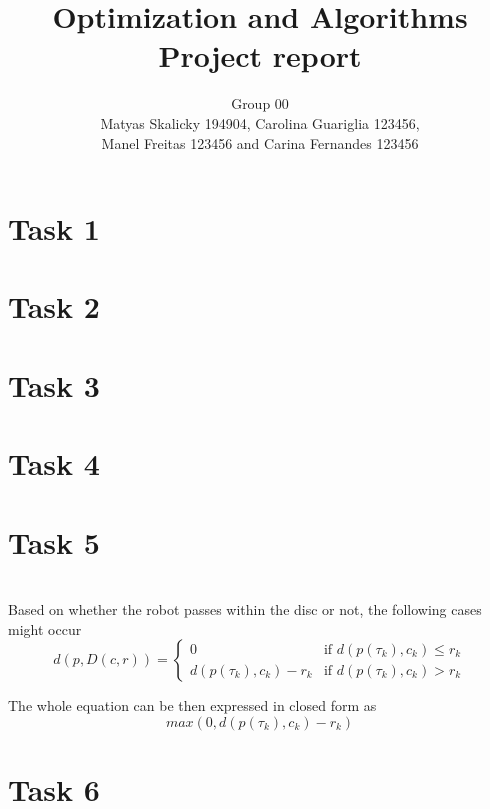 \documentclass[12pt]{article}
\title{Optimization and Algorithms \\ Project report}
\author{Group 00 \\ Matyas Skalicky 194904, Carolina Guariglia 123456, \\Manel Freitas 123456 and Carina Fernandes 123456}
\date{}
\begin{document}
\maketitle

\section{Task 1}


\section{Task 2}

\section{Task 3}

\section{Task 4}

\section{Task 5}
\noindent{} \\

Based on whether the robot passes within the disc or not, the following cases might occur
\begin{equation}
	d\left( p,D(c,r) \right) = 
	\begin{cases} 
		0				 			& \text{if } d\left(p(\tau_{k}), c_{k}\right) \leq r_{k}\\
		d\left(p(\tau_{k}), c_{k}\right) - r_{k} 	& \text{if } d\left(p(\tau_{k}), c_{k}\right) > r_{k}
	\end{cases}
\end{equation}


The whole equation can be then expressed in closed form as 
\begin{equation}
	\textit{max}\left(0, d\left(p(\tau_{k}), c_{k}\right) - r_{k}\right)
\end{equation}

\section{Task 6}
\end{document}
